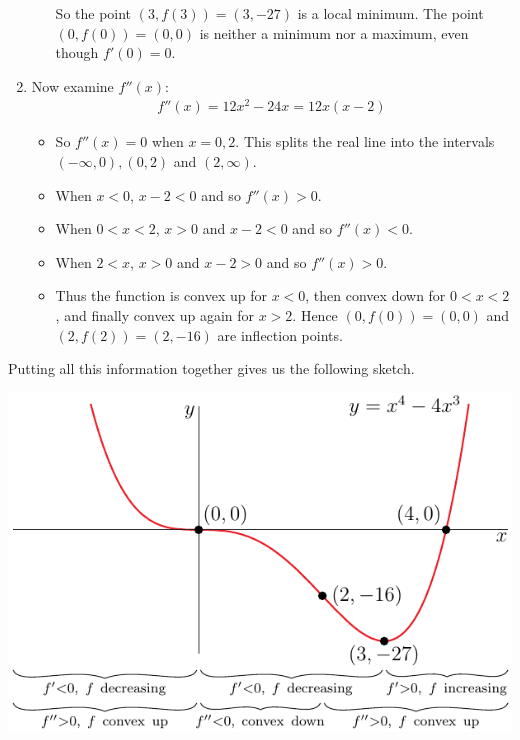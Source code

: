 \begin{eg}[Sketch $f(x)=x^4-4x^3$]
\begin{enumerate}[(1)]
\begin{itemize}
So the point $(3,f(3))=(3,-27)$ is a local minimum. The point $(0,f(0))=(0,0)$
is neither a minimum nor a maximum, even though $f'(0)=0$.
\end{itemize}
\item Now examine $f''(x)$:
\begin{align*}
f''(x) = 12x^2-24x=12x(x-2)
\end{align*}
\begin{itemize}
\item So $f''(x)=0$ when $x=0,2$. This splits the real line into the intervals
$(-\infty,0),(0,2)$ and $(2,\infty)$.
 \item When $x<0$, $x-2<0$ and so $f''(x)>0$.
 \item When $0<x<2$, $x>0$ and $x-2<0$ and so $f''(x)<0$.
 \item When $2<x$, $x>0$ and $x-2>0$ and so $f''(x)>0$.
\item Thus the function is convex up for $x<0$, then convex down for $0<x<2$, and finally
convex up again for $x>2$. Hence $(0,f(0))=(0,0)$ and $(2,f(2))=(2,-16)$ are inflection
points.
\end{itemize}
\end{enumerate}
Putting all this information together gives us the following sketch.
\begin{efig}
\begin{center}
   \includegraphics{sketch2}
\end{center}
\end{efig}
\end{eg}

